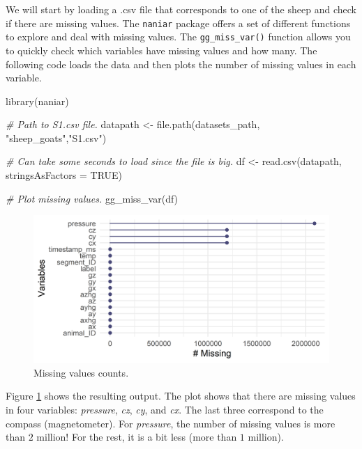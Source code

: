 \documentclass[
  11pt,
]{krantz}
\newenvironment{Shaded}{\begin{snugshade}}{\end{snugshade}}
\newcommand{\AttributeTok}[1]{\textcolor[rgb]{0.61,0.61,0.61}{#1}}
\newcommand{\CommentTok}[1]{\textcolor[rgb]{0.37,0.37,0.37}{\textit{#1}}}
\newcommand{\ConstantTok}[1]{\textcolor[rgb]{0,0,0}{#1}}
\newcommand{\FunctionTok}[1]{\textcolor[rgb]{0,0,0}{#1}}
\newcommand{\NormalTok}[1]{#1}
\newcommand{\OtherTok}[1]{\textcolor[rgb]{0.37,0.37,0.37}{#1}}
\newcommand{\StringTok}[1]{\textcolor[rgb]{0.5,0.5,0.5}{#1}}
\begin{document}
We will start by loading a .csv file that corresponds to one of the sheep and check if there are missing values. The \texttt{naniar} package \citep{naniar} offers a set of different functions to explore and deal with missing values. The \texttt{gg\_miss\_var()} function allows you to quickly check which variables have missing values and how many. The following code loads the data and then plots the number of missing values in each variable.

\begin{Shaded}
\begin{Highlighting}[]
\FunctionTok{library}\NormalTok{(naniar)}

\CommentTok{\# Path to S1.csv file.}
\NormalTok{datapath }\OtherTok{\textless{}{-}} \FunctionTok{file.path}\NormalTok{(datasets\_path,}
                      \StringTok{"sheep\_goats"}\NormalTok{,}\StringTok{"S1.csv"}\NormalTok{)}

\CommentTok{\# Can take some seconds to load since the file is big.}
\NormalTok{df }\OtherTok{\textless{}{-}} \FunctionTok{read.csv}\NormalTok{(datapath, }\AttributeTok{stringsAsFactors =} \ConstantTok{TRUE}\NormalTok{)}

\CommentTok{\# Plot missing values.}
\FunctionTok{gg\_miss\_var}\NormalTok{(df)}
\end{Highlighting}
\end{Shaded}

\begin{figure}

{\centering \includegraphics[width=1\linewidth]{images/ggmissvar} 

}

\caption{Missing values counts.}\label{fig:ggmissvar}
\end{figure}

Figure \ref{fig:ggmissvar} shows the resulting output. The plot shows that there are missing values in four variables: \emph{pressure}, \emph{cz}, \emph{cy}, and \emph{cx}. The last three correspond to the compass (magnetometer). For \emph{pressure}, the number of missing values is more than \(2\) million! For the rest, it is a bit less (more than \(1\) million).
\end{document}
